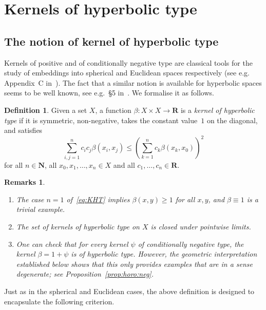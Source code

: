 \documentclass[11pt]{article}
\newtheorem{remas}[theo]{Remarks}
\theoremstyle{definition}
\newtheorem{defi}[theo]{Definition}
\numberwithin{equation}{section}
\numberwithin{figure}{section}
\numberwithin{table}{section}
\newcommand{\RR}{\mathbf{R}}
\newcommand{\NN}{\mathbf{N}}
\newcommand*{\romanenumi}{\renewcommand*{\theenumi}{\roman{enumi}}}
\begin{document}
\section{Kernels of hyperbolic type}\label{sec:kernels}

\subsection{The notion of kernel of hyperbolic type}

Kernels of positive and of conditionally negative type are classical tools for the study of embeddings into spherical and Euclidean spaces respectively (see e.g. Appendix~C in~\cite{Bekka-Harpe-Valette}). The fact that a similar notion is available for hyperbolic spaces seems to be well known, see e.g.~\S5 in~\cite{Gromov_conc}. We formalise it as follows.

\begin{defi}\label{def:KHT}
Given a set $X$, a function $\beta\colon X\times X\to\RR$ is a \emph{kernel of hyperbolic type} if it is symmetric, non-negative, takes the constant value~$1$ on the diagonal, and satisfies
\begin{equation}\label{eq:KHT}
\sum_{i,j=1}^n c_i c_j \beta(x_i, x_j) \leq \left(\sum_{k=1}^n c_k \beta(x_k, x_0)\right)^2
\end{equation}
for all $n\in \NN$, all $x_0, x_1, \ldots, x_n\in X$ and all $c_1, \ldots, c_n\in \RR$.
\end{defi}

\begin{remas}\label{rems:KHT}
\begin{enumerate}\romanenumi
\item The case $n=1$ of~\eqref{eq:KHT} implies $\beta(x,y)\geq 1$ for all $x,y$, and $\beta\equiv 1$ is a trivial example.

\item The set of kernels of hyperbolic type on $X$ is closed under pointwise limits.

\item One can check that for every kernel $\psi$ of \emph{conditionally negative type}, the kernel $\beta=1+\psi$ is of hyperbolic type. However, the geometric interpretation established below shows that this only provides examples that are in a sense degenerate; see Proposition~\ref{prop:horo:neg}.
\end{enumerate}
\end{remas}

Just as in the spherical and Euclidean cases, the above definition is designed to encapsulate the following criterion.
\end{document}
